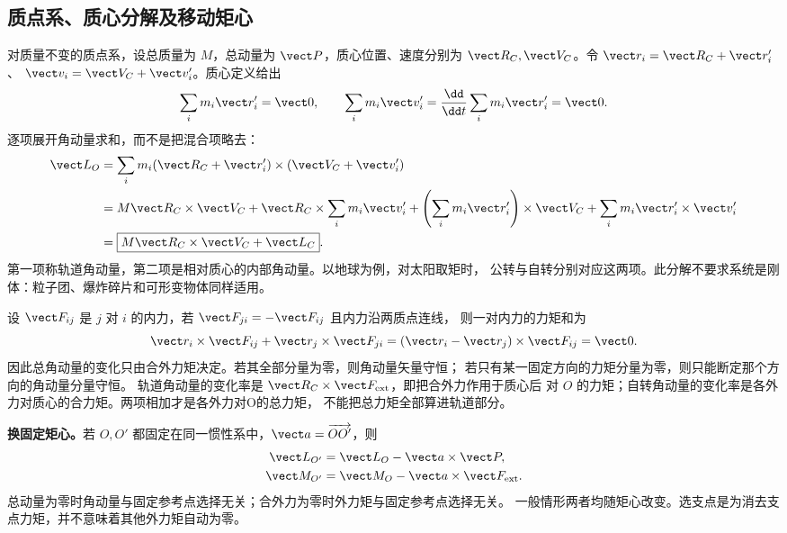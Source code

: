 \subsection{质点系、质心分解及移动矩心}
对质量不变的质点系，设总质量为 $M$，总动量为 $\vect P$，质心位置、速度分别为
$\vect R_C,\vect V_C$。令 $\vect r_i=\vect R_C+\vect r_i'$、
$\vect v_i=\vect V_C+\vect v_i'$。质心定义给出
\begin{equation}
 \sum_i m_i\vect r_i'=\vect0,\qquad
 \sum_i m_i\vect v_i'=\frac{\dd}{\dd t}\sum_i m_i\vect r_i'=\vect0.
\end{equation}
逐项展开角动量求和，而不是把混合项略去：
\begin{align}
 \vect L_O&=\sum_i m_i(\vect R_C+\vect r_i')\times(\vect V_C+\vect v_i')\\
 &=M\vect R_C\times\vect V_C
 +\vect R_C\times\sum_i m_i\vect v_i'
 +\left(\sum_i m_i\vect r_i'\right)\times\vect V_C
 +\sum_i m_i\vect r_i'\times\vect v_i'\\
 &=\boxed{M\vect R_C\times\vect V_C+\vect L_C}.
\end{align}
第一项称轨道角动量，第二项是相对质心的内部角动量。以地球为例，对太阳取矩时，
公转与自转分别对应这两项。此分解不要求系统是刚体：粒子团、爆炸碎片和可形变物体同样适用。

设 $\vect F_{ij}$ 是 $j$ 对 $i$ 的内力，若 $\vect F_{ji}=-\vect F_{ij}$ 且内力沿两质点连线，
则一对内力的力矩和为
\begin{equation}
 \vect r_i\times\vect F_{ij}+\vect r_j\times\vect F_{ji}
 =(\vect r_i-\vect r_j)\times\vect F_{ij}=\vect0.
\end{equation}
因此总角动量的变化只由合外力矩决定。若其全部分量为零，则角动量矢量守恒；
若只有某一固定方向的力矩分量为零，则只能断定那个方向的角动量分量守恒。
轨道角动量的变化率是 $\vect R_C\times\vect F_{\rm ext}$，即把合外力作用于质心后
对 $O$ 的力矩；自转角动量的变化率是各外力对质心的合力矩。两项相加才是各外力对O的总力矩，
不能把总力矩全部算进轨道部分。

\textbf{换固定矩心。}若 $O,O'$ 都固定在同一惯性系中，$\vect a=\overrightarrow{OO'}$，则
\begin{align}
 \vect L_{O'}&=\vect L_O-\vect a\times\vect P,\\
 \vect M_{O'}&=\vect M_O-\vect a\times\vect F_{\rm ext}.
\end{align}
总动量为零时角动量与固定参考点选择无关；合外力为零时外力矩与固定参考点选择无关。
一般情形两者均随矩心改变。选支点是为消去支点力矩，并不意味着其他外力矩自动为零。

